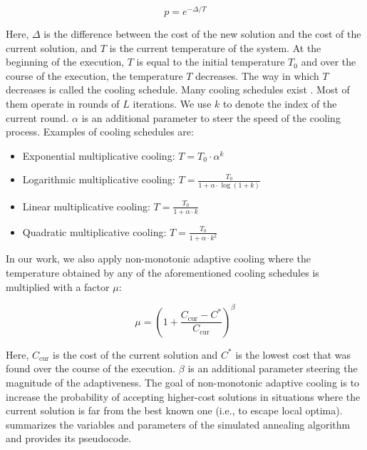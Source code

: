 \begin{equation} \label{eq:back-opt-metro}
	p = e^{-\Delta / T}
\end{equation}

Here, $\Delta$ is the difference between the cost of the new solution and the cost of the current solution, and $T$ is the current temperature of the system.
At the beginning of the execution, $T$ is equal to the initial temperature $T_0$ and over the course of the execution, the temperature $T$ decreases.
The way in which $T$ decreases is called the cooling schedule.
Many cooling schedules exist \cite{sa-1, sa-2}.
Most of them operate in rounds of $L$ iterations.
We use $k$ to denote the index of the current round.
$\alpha$ is an additional parameter to steer the speed of the cooling process.
Examples of cooling schedules are:

\begin{itemize}
	\item	Exponential multiplicative cooling: $T = T_0 \cdot \alpha^k$
	\item	Logarithmic multiplicative cooling: $T = \frac{T_0}{1 + \alpha \cdot \log(1+k)}$
	\item	Linear multiplicative cooling: $T = \frac{T_0}{1 + \alpha \cdot k}$
	\item	Quadratic multiplicative cooling: $T = \frac{T_0}{1 + \alpha \cdot k^2}$
\end{itemize}



In our work, we also apply non-monotonic adaptive cooling \cite{sa-nma-cooling} where the temperature obtained by any of the aforementioned cooling schedules is multiplied with a factor $\mu$:

\begin{equation} \label{eq:}
	\mu = \left ( 1 + \frac{C_\text{cur} - C^*}{C_\text{cur}} \right )^\beta
\end{equation}

Here, $C_\text{cur}$ is the cost of the current solution and $C^*$ is the lowest cost that was found over the course of the execution.
$\beta$ is an additional parameter steering the magnitude of the adaptiveness.
The goal of non-monotonic adaptive cooling is to increase the probability of accepting higher-cost solutions in situations where the current solution is far from the best known one (i.e., to escape local optima). 
 summarizes the variables and parameters of the simulated annealing algorithm and  provides its pseudocode.





